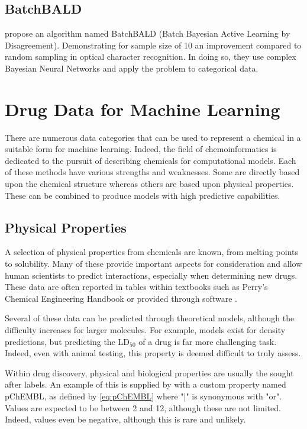 \subsection{BatchBALD}
\textcite{BatchBALD} propose an algorithm named BatchBALD (Batch Bayesian Active Learning by Disagreement). Demonstrating for sample size of 10 an improvement compared to random sampling in optical character recognition. In doing so, they use complex Bayesian Neural Networks and apply the problem to categorical data.

\section{Drug Data for Machine Learning}
There are numerous data categories that can be used to represent a chemical in a suitable form for machine learning. Indeed, the field of chemoinformatics is dedicated to the pursuit of describing chemicals for computational models. Each of these methods have various strengths and weaknesses. Some are directly based upon the chemical structure whereas others are based upon physical properties. These can be combined to produce models with high predictive capabilities.

\subsection{Physical Properties}
A selection of physical properties from chemicals are known, from melting points to solubility. Many of these provide important aspects for consideration and allow human scientists to predict interactions, especially when determining new drugs. These data are often reported in tables within textbooks such as Perry's Chemical Engineering Handbook or provided through software \cite{CHEMBL,Perrys}.

Several of these data can be predicted through theoretical models, although the difficulty increases for larger molecules. For example, models exist for density predictions, but predicting the $\mathrm{LD_{50}}$ of a drug is  far more challenging task. Indeed, even with animal testing, this property is deemed difficult to truly assess.

Within drug discovery, physical and biological properties are usually the sought after labels. An example of this is supplied by \textcite{CHEMBL} with a custom property named pChEMBL, as defined by \ref{eq:pChEMBL} where  "|" is synonymous with "or". Values are expected to be between 2 and 12, although these are not limited. Indeed, values even be negative, although this is rare and unlikely.

